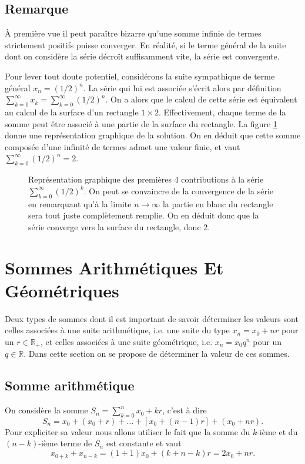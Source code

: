 \documentclass[oneside,11pt,french,table]{book}
\theoremstyle{definition}
\theoremstyle{plain}
\theoremstyle{remark}
\begin{document}
    \subsection{Remarque}
        À première vue il peut paraître bizarre qu'une somme infinie de termes strictement positifs puisse converger. En réalité, si le terme général de la suite dont on considère la série décroît suffisamment vite, la  série est convergente. 
        
        Pour lever tout doute potentiel, considérons la suite sympathique de terme général $x_n=(1/2)^n$. La série qui lui est associée s'écrit alors par définition $\sum_{k=0}^{\infty}x_k=\sum_{k=0}^{\infty}(1/2)^n$. On a alors que le calcul de cette série est équivalent au calcul de la surface d'un rectangle $1\times 2$. Effectivement, chaque terme de la somme peut être associé à une partie de la surface du rectangle. La figure \ref{fig:somme_exemple} donne une représentation graphique de la solution. On en déduit que cette somme composée d'une infinité de termes admet une valeur finie, et vaut $\sum_{k=0}^{\infty}(1/2)^n=2$.
        \begin{figure}[h!]
            \centering
          
            \def\svgwidth{0.5\textwidth}
            
            \caption{Représentation graphique des premières 4 contributions à la série $\sum_{k=0}^{\infty}(1/2)^k$. On peut se convaincre de la convergence de la série en remarquant qu'à la limite $n\to\infty$ la partie en blanc du rectangle sera tout juste complètement remplie. On en déduit donc que la série converge vers la surface du rectangle, donc 2.}
              \label{fig:somme_exemple}
        \end{figure}
\section{Sommes Arithmétiques Et Géométriques}
    Deux types de sommes dont il est important de savoir déterminer les valeurs sont celles associées à une suite arithmétique, i.e. une suite du type $x_n=x_0+nr$ pour un $r\in\mathbb{R_+}$, et celles associées à une suite géométrique, i.e. $x_n=x_0q^n$ pour un $q\in\mathbb{R}$. Dans cette section on se propose de déterminer la valeur de ces sommes.
    \subsection{Somme arithmétique}
        On considère la somme $S_n=\sum_{k=0}^{n}x_0+kr$, c'est à dire 
        \[
            S_n=x_0 + (x_0+r) + \dots + [x_0+(n-1)r]+ (x_0+nr).
        \]
        Pour expliciter sa valeur nous allons utiliser le fait que la somme du $k$-ième et du $(n-k)$-ième terme de $S_n$ est constante et vaut 
        \[
            x_{0+k}+x_{n-k}=(1+1)x_0 + (k+n-k)r = 2x_0+nr.
        \]
        
\end{document}
